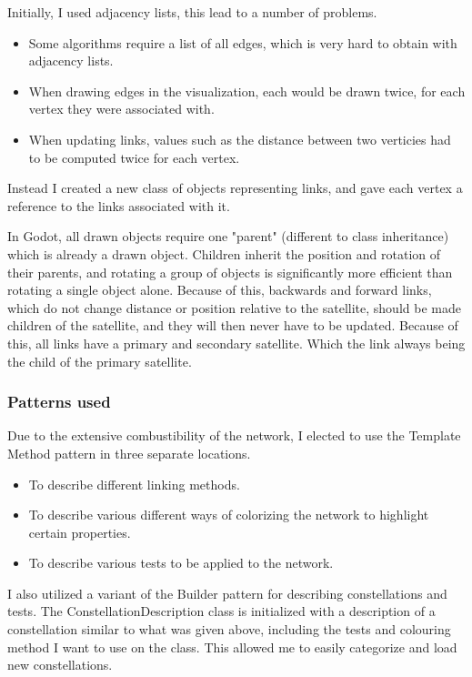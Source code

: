 \documentclass[12pt]{article}
\begin{document}
Initially, I used adjacency lists, this lead to a number of problems.

\begin{itemize}
\item Some algorithms require a list of all edges, which is very hard to obtain with adjacency lists.
\item When drawing edges in the visualization, each would be drawn twice, for each vertex they were associated with.
\item When updating links, values such as the distance between two verticies had to be computed twice for each vertex.
\end{itemize}

Instead I created a new class of objects representing links, and gave each vertex a reference to the links associated with it. 

In Godot, all drawn objects require one "parent" (different to class inheritance) which is already a drawn object. Children inherit the position and rotation of their parents, and rotating a group of objects is significantly more efficient than rotating a single object alone. Because of this, backwards and forward links, which do not change distance or position relative to the satellite, should be made children of the satellite, and they will then never have to be updated. Because of this, all links have a primary and secondary satellite. Which the link always being the child of the primary satellite.

\subsubsection{Patterns used}

Due to the extensive combustibility of the network, I elected to use the Template Method pattern in three separate locations.

\begin{itemize}
\item To describe different linking methods.
\item To describe various different ways of colorizing the network to highlight certain properties.
\item To describe various tests to be applied to the network.
\end{itemize}

I also utilized a variant of the Builder pattern for describing constellations and tests. The ConstellationDescription class is initialized with a description of a constellation similar to what was given above, including the tests and colouring method I want to use on the class. This allowed me to easily categorize and load new constellations.
\end{document}
